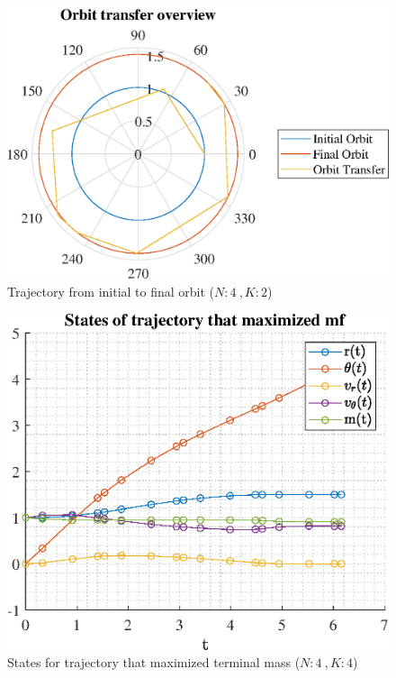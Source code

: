 \documentclass[]{article}
\begin{document}
	\begin{figure}
		\centering
		\includegraphics[scale=0.75]{orbit_N4_K2_C3_mf.eps}
		\caption{Trajectory from initial to final orbit (\(N:4\ , K:2\))}
		\label{fig:orbit_N4_K2_C3_mf}
	\end{figure}
	\begin{figure}
		\centering
		\includegraphics[scale=0.75]{states_N4_K4_C3_mf.eps}
		\caption{States for trajectory that maximized terminal mass (\(N:4\ , K:4\))}
		\label{fig:states_N4_K4_C3_mf}
	\end{figure}
\end{document}
